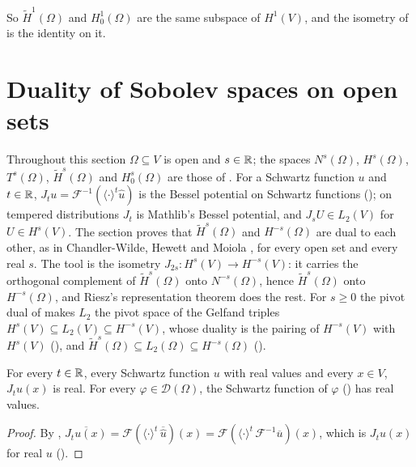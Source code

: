 So $\tilde H^1(\Omega)$ and $H^1_0(\Omega)$ are the same subspace of $H^1(V)$, and the isometry of
 is the identity on it.

\section{Duality of Sobolev spaces on open sets}
\label{sec:sobolev-duality}

Throughout this section $\Omega \subseteq V$ is open and $s \in \mathbb{R}$; the spaces $N^s(\Omega)$,
$H^s(\Omega)$, $T^s(\Omega)$, $\tilde H^s(\Omega)$ and $H^s_0(\Omega)$ are those of
. For a Schwartz function $u$ and $t \in \mathbb{R}$,
$J_t u = \mathcal F^{-1}(\langle \cdot \rangle^t \widehat u)$ is the Bessel potential on Schwartz
functions (); on tempered distributions $J_t$ is Mathlib's Bessel
potential, and $J_s U \in L_2(V)$ for $U \in H^s(V)$. The section proves that
$\tilde H^s(\Omega)$ and $H^{-s}(\Omega)$ are dual to each other, as in Chandler-Wilde, Hewett
and Moiola \cite[Theorem 3.3]{ChandlerWildeHewettMoiola}, for every open set and every real $s$.
The tool is the isometry $J_{2s} : H^s(V) \to H^{-s}(V)$: it carries the orthogonal complement
of $\tilde H^s(\Omega)$ onto $N^{-s}(\Omega)$, hence $\tilde H^s(\Omega)$ onto $H^{-s}(\Omega)$,
and Riesz's representation theorem does the rest. For $s \geq 0$ the pivot dual of
 makes $L_2$ the pivot space of the Gelfand triples
$H^s(V) \subseteq L_2(V) \subseteq H^{-s}(V)$, whose duality is the pairing of $H^{-s}(V)$ with
$H^s(V)$ (), and
$\tilde H^s(\Omega) \subseteq L_2(\Omega) \subseteq H^{-s}(\Omega)$
().

\begin{lemma}
\label{lem:bessel-schwartz-real}
\leanok
{}
For every $t \in \mathbb{R}$, every Schwartz function $u$ with real values and every $x \in V$,
$J_t u(x)$ is real. For every
$\varphi \in \mathcal D(\Omega)$, the Schwartz function of $\varphi$ ()
has real values.
\end{lemma}

\begin{proof}
\leanok
By ,
$\overline{J_t u(x)} = \mathcal F(\langle \cdot \rangle^t \, \overline{\widehat u})(x) =
\mathcal F(\langle \cdot \rangle^t \, \mathcal F^{-1} \overline u)(x)$, which is $J_t u(x)$ for
real $u$ ().
\end{proof}

